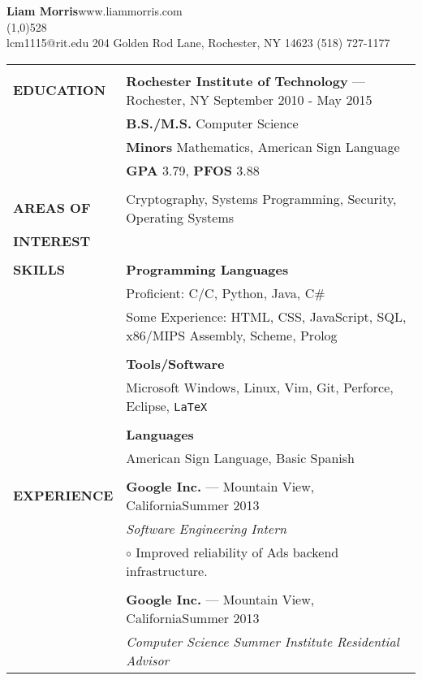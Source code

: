 \documentclass[10pt,letterpaper]{article}
\newcommand{\CPP}
{C\nolinebreak[4]\hspace{-.05em}\raisebox{.22ex}{\footnotesize\bf ++}}
\begin{document}
\raggedright

\textbf{\huge{Liam Morris}}\hfill www.liammorris.com\\
\vspace{-8pt}
\line(1,0){528}\\
lcm1115@rit.edu \hfill 204 Golden Rod Lane, Rochester, NY 14623 \hfill (518)
727-1177\\
\vspace{5pt}

\begin{tabular}{@{}lp{6.4in}}
&\\
\textbf{EDUCATION}
&\textbf{Rochester Institute of Technology} --- Rochester, NY \hfill September 2010 - May 2015\\
&\textbf{B.S./M.S.} Computer Science\\
&\textbf{Minors} Mathematics, American Sign Language\\
&\textbf{GPA} 3.79, \textbf{PFOS} 3.88\\
&\\
\textbf{AREAS OF}
&Cryptography, Systems Programming, Security, Operating Systems\\
\textbf{INTEREST}&\\
&\\
\textbf{SKILLS}
&\textbf{Programming Languages}\\
&Proficient: C/\CPP, Python, Java, C\#\\
&Some Experience: HTML, CSS, JavaScript, SQL, x86/MIPS Assembly, Scheme, Prolog\\
&\\
&\textbf{Tools/Software}\\
&Microsoft Windows, Linux, Vim, Git, Perforce, Eclipse, \texttt{\LaTeX}\\
&\\
&\textbf{Languages}\\
&American Sign Language, Basic Spanish\\
&\\
\textbf{EXPERIENCE}
&\textbf{Google Inc.} --- Mountain View, California\hfill Summer 2013\\
&\emph{Software Engineering Intern}\\
&\hspace{10pt}$\circ$ Improved reliability of Ads backend infrastructure.\\
&\\
&\textbf{Google Inc.} --- Mountain View, California\hfill Summer 2013\\
&\emph{Computer Science Summer Institute Residential Advisor}\\

\end{tabular}
\end{document}
